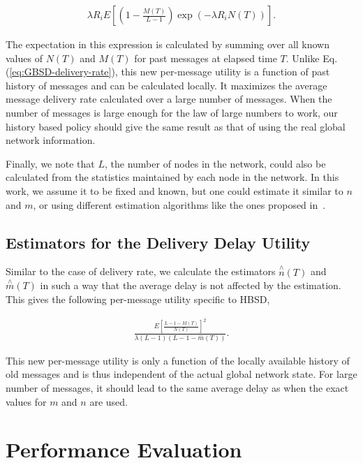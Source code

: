 \begin{align}
\label{HBSD-DR-U}
\lambda R_i E[(1-\frac{M(T)}{L-1})\exp( - \lambda R_i N(T))].
\end{align}

The expectation in this expression is calculated by summing over all known values of $N(T)$ and $M(T)$ for past messages at elapsed time $T$. Unlike Eq.(\ref{eq:GBSD-delivery-rate}), this new per-message utility is a function of past history of messages and can be calculated locally. It maximizes the average message delivery rate calculated over a large number of messages. When the number of messages is large enough for the law of large numbers to work, our history based policy should give the same result as that of using the real global network information.

Finally, we note that $L$, the number of nodes in the network, could also be calculated from the statistics maintained by each node in the network. In this work, we assume it to be fixed and known, but one could estimate it similar to $n$ and $m$, or using different estimation algorithms like the ones proposed in~\cite{PellegriniAOC2009}.

\subsection{Estimators for the Delivery Delay Utility}
\label{sec:learning:EDD}

Similar to the case of delivery rate, we calculate the estimators $\stackrel{\wedge}{n}(T)$ and $\stackrel{\wedge}{m}(T)$ in such a way that the average delay is not affected by the estimation. This gives the following per-message utility specific to HBSD,

\begin{align}
\label{HBSD-DD-U}
\frac{E[\frac{L-1-M(T)}{N(T)}]^2}{\lambda
(L-1)(L-1-\stackrel{-}{m}(T))}.
\end{align}

This new per-message utility is only a function of the locally available history of old messages and is thus
independent of the actual global network state. For large number of messages, it should lead to the same average delay
as when the exact values for $m$ and $n$ are used.


\section{Performance Evaluation}
\label{sec:sims}

